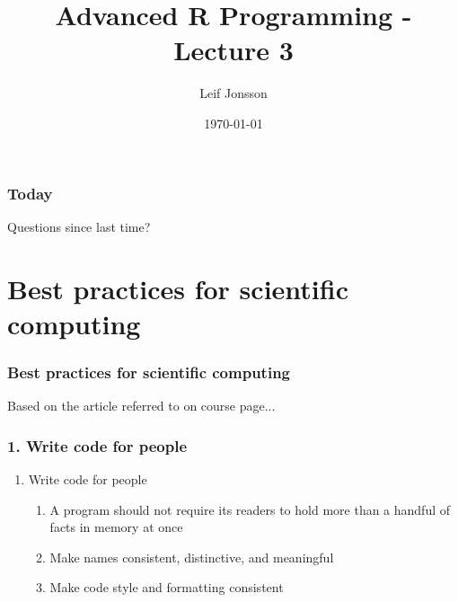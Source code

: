 \documentclass{beamer}
\title[Lecture 3]{Advanced R Programming - Lecture 3} %
\author{Leif Jonsson} %
\institute[STIMA LiU] %
{
Link\"{o}ping University \\ %
\medskip
\textit{leif.jonsson@ericsson.com\\leif.r.jonsson@liu.se} %
}
\date{\today} %
\begin{document}
\begin{frame}
\titlepage %
\end{frame}

\begin{frame}
\frametitle{Today} %
\tableofcontents %
\end{frame}


\begin{frame}
	\Huge{\centerline{Questions since last time?}}
\end{frame}

\section{Best practices	for scientific computing} 

\begin{frame}
\frametitle{Best practices	for scientific computing}
Based on the article referred to on course page...
\end{frame}

\begin{frame}
	\frametitle{1. Write code for people}
	\begin{enumerate}
		\item Write code for people
		\begin{enumerate}
			\item A program should not require its readers to hold more than a 
			handful of facts in memory at once
			\item Make names consistent, distinctive, and meaningful
			\item Make code style and formatting consistent
		\end{enumerate}
	\end{enumerate}		
\end{frame}
\end{document}
